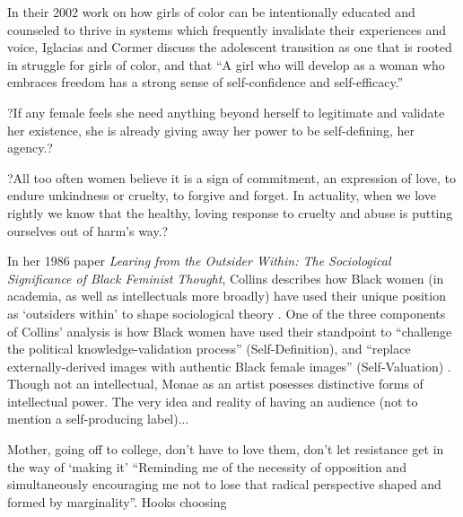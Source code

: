 \documentclass[a4paper, 11pt]{article} %
\begin{document}
In their 2002 work on how girls of color can be intentionally educated and counseled to thrive in systems which frequently invalidate their experiences and voice, Iglacias and Cormer discuss the adolescent transition as one that is rooted in struggle for girls of color, and that ``A girl who will develop as a woman who embraces freedom has a strong sense of self-confidence and self-efficacy.'' \cite{iglesiascormier}

?If any female feels she need anything beyond herself to legitimate and validate her existence, she is already giving away her power to be self-defining, her agency.? \cite{hooksforeveryone}

?All too often women believe it is a sign of commitment, an expression of love, to endure unkindness or cruelty, to forgive and forget. In actuality, when we love rightly we know that the healthy, loving response to cruelty and abuse is putting ourselves out of harm's way.? \cite{newvisions}

In her 1986 paper \emph{Learing from the Outsider Within: The Sociological Significance of Black Feminist Thought}, Collins describes how Black women (in academia, as well as intellectuals more broadly) have used their unique position as `outsiders within' to shape sociological theory \cite{collins86}.
One of the three components of Collins' analysis is how Black women have used their standpoint to ``challenge the political knowledge-validation process'' (Self-Definition), and ``replace externally-derived images with authentic Black female images'' (Self-Valuation) \cite{collins86}.
Though not an intellectual, Monae as an artist posesses distinctive forms of intellectual power.
The very idea and reality of having an audience (not to mention a self-producing label)...

Mother, going off to college, don't have to love them, don't let resistance get in the way of `making it' ``Reminding me of the necessity of opposition and simultaneously encouraging me not to lose that radical perspective shaped and formed by marginality''. Hooks choosing


{}


\end{document}
